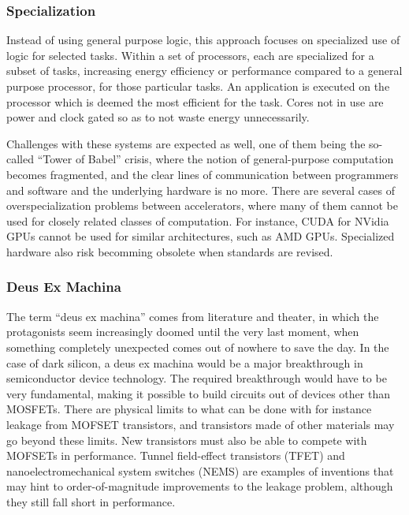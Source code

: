 \subsubsection{Specialization}
Instead of using general purpose logic, this approach focuses on specialized use of logic for selected tasks.
Within a set of processors, each are specialized for a subset of tasks, increasing energy efficiency or performance compared to a general purpose processor, for those particular tasks.
An application is executed on the processor which is deemed the most efficient for the task.
Cores not in use are power and clock gated so as to not waste energy unnecessarily.


Challenges with these systems are expected as well, one of them being the so-called ``Tower of Babel'' crisis, where
the notion of general-purpose computation becomes fragmented, and the clear lines of communication between programmers and software and the underlying hardware is no more.
There are several cases of overspecialization problems between accelerators, where many of them cannot be used for closely related classes of computation.
For instance, CUDA for NVidia GPUs cannot be used for similar architectures, such as AMD GPUs.
Specialized hardware also risk becomming obsolete when standards are revised. \cite{dark-silicon}

\subsubsection{Deus Ex Machina}
The term ``deus ex machina'' comes from literature and theater, in which the protagonists seem increasingly doomed until the very last moment, when something completely unexpected comes out of nowhere to save the day.
In the case of dark silicon, a deus ex machina would be a major breakthrough in semiconductor device technology.
The required breakthrough would have to be very fundamental, making it possible to build circuits out of devices other than MOSFETs. 
There are physical limits to what can be done with for instance leakage from MOFSET transistors, and transistors made of other materials may go beyond these limits.
New transistors must also be able to compete with MOFSETs in performance.
Tunnel field-effect transistors (TFET) and nanoelectromechanical system switches (NEMS) are examples of inventions that may hint to order-of-magnitude improvements to the leakage problem, although they still fall short in performance. \cite{dark-silicon}

